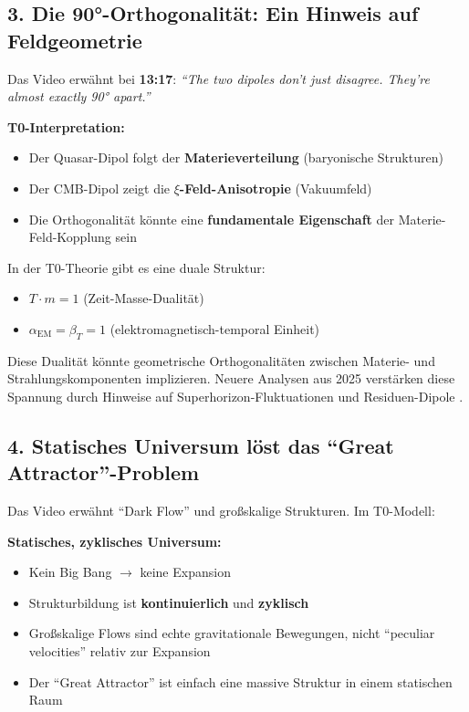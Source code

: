 \documentclass{article}
\begin{document}
	\subsection{3. Die 90°-Orthogonalität: Ein Hinweis auf Feldgeometrie}
	
	Das Video erwähnt bei \textbf{13:17}: \textit{``The two dipoles don't just disagree. They're almost exactly 90° apart.''} \cite{secrest2024}
	
	\textbf{T0-Interpretation:}
	\begin{itemize}
		\item Der Quasar-Dipol folgt der \textbf{Materieverteilung} (baryonische Strukturen)
		\item Der CMB-Dipol zeigt die \textbf{$\xi$-Feld-Anisotropie} (Vakuumfeld)
		\item Die Orthogonalität könnte eine \textbf{fundamentale Eigenschaft} der Materie-Feld-Kopplung sein
	\end{itemize}
	
	In der T0-Theorie gibt es eine duale Struktur:
	\begin{itemize}
		\item $T \cdot m = 1$ (Zeit-Masse-Dualität)
		\item $\alpha_{\text{EM}} = \beta_T = 1$ (elektromagnetisch-temporal Einheit)
	\end{itemize}
	
	Diese Dualität könnte geometrische Orthogonalitäten zwischen Materie- und Strahlungskomponenten implizieren. 
	Neuere Analysen aus 2025 verstärken diese Spannung durch Hinweise auf Superhorizon-Fluktuationen und Residuen-Dipole \cite{sarkar2025, bengaly2025}.
	
	\subsection{4. Statisches Universum löst das ``Great Attractor''-Problem}
	
	Das Video erwähnt ``Dark Flow'' und großskalige Strukturen. Im T0-Modell:
	
	\textbf{Statisches, zyklisches Universum:}
	\begin{itemize}
		\item Kein Big Bang $\rightarrow$ keine Expansion
		\item Strukturbildung ist \textbf{kontinuierlich} und \textbf{zyklisch}
		\item Großskalige Flows sind echte gravitationale Bewegungen, nicht ``peculiar velocities'' relativ zur Expansion
		\item Der ``Great Attractor'' ist einfach eine massive Struktur in einem statischen Raum
	\end{itemize}
	
\end{document}
